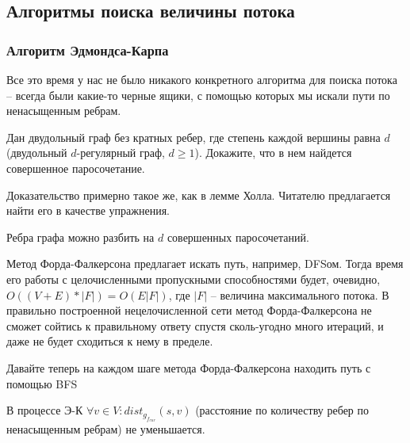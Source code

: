 \subsection{Алгоритмы поиска величины потока}

\subsubsection{Алгоритм Эдмондса-Карпа}

Все это время у нас не было никакого конкретного алгоритма для поиска потока -- всегда были какие-то черные ящики, с помощью которых мы искали пути по ненасыщенным ребрам.

\begin{problem}
    Дан двудольный граф без кратных ребер, где степень каждой вершины равна $d$ (двудольный $d$-регулярный граф, $d \geq 1$). Докажите, что в нем найдется совершенное паросочетание.
\end{problem}

\begin{solution}
    Доказательство примерно такое же, как в лемме Холла. Читателю предлагается найти его в качестве упражнения.
\end{solution}

\begin{corollary}
    Ребра графа можно разбить на $d$ совершенных паросочетаний.
\end{corollary} 

\noindent Метод Форда-Фалкерсона предлагает искать путь, например, DFSом. Тогда время его работы с целочисленными пропускными способностями будет, очевидно, $O((V + E) * |F|) = O(E|F|)$, где $|F|$ -- величина максимального потока. В правильно построенной нецелочисленной сети метод Форда-Фалкерсона не сможет сойтись к правильному ответу спустя сколь-угодно много итераций, и даже не будет сходиться к нему в пределе.

\begin{algorithm}
    Давайте теперь на каждом шаге метода Форда-Фалкерсона находить путь с помощью BFS
\end{algorithm}

\begin{lemma}
    В процессе Э-К $\forall v \in V: dist_{g_{f_{cur}}} (s, v)$ (расстояние по количеству ребер по ненасыщенным ребрам) не уменьшается.
\end{lemma}

